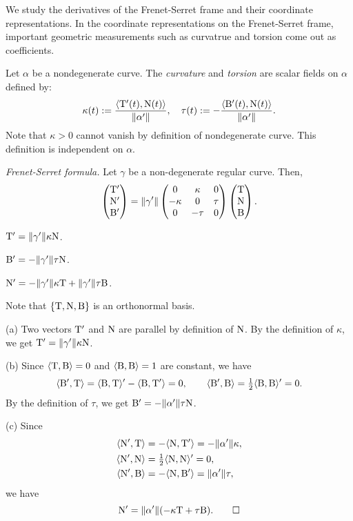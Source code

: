 \documentclass{../note}
\def\a{\alpha}
\begin{document}
We study the derivatives of the Frenet-Serret frame and their coordinate representations.
In the coordinate representations on the Frenet-Serret frame, important geometric measurements such as curvatrue and torsion come out as coefficients.

\begin{defn}
Let $\a$ be a nondegenerate curve.
The \emph{curvature} and \emph{torsion} are scalar fields on $\a$ defined by:
\[\kappa(t):=\frac{\<\rT'(t),\rN(t)\>}{\|\a'\|},\quad\tau(t):=-\frac{\<\rB'(t),\rN(t)\>}{\|\a'\|}.\]
Note that $\kappa>0$ cannot vanish by definition of nondegenerate curve.
This definition is independent on $\a$.
\end{defn}

\begin{prb}\emph{Frenet-Serret formula.}
Let $\gamma$ be a non-degenerate regular curve.
Then,
\[\begin{pmatrix}\mathrm{T}'\\\mathrm{N}'\\\mathrm{B}'\end{pmatrix}=\|\gamma'\|\begin{pmatrix}0&\kappa&0\\-\kappa&0&\tau\\0&-\tau&0\end{pmatrix}\begin{pmatrix}\mathrm{T}\\\mathrm{N}\\\mathrm{B}\end{pmatrix}.\]
\begin{parts}
\item $\mathrm{T}'=\|\gamma'\|\kappa\mathrm{N}$.
\item $\mathrm{B}'=-\|\gamma'\|\tau\mathrm{N}$.
\item $\mathrm{N}'=-\|\gamma'\|\kappa\mathrm{T}+\|\gamma'\|\tau\mathrm{B}$.
\end{parts}
\end{prb}
\begin{pf}
Note that $\{\mathrm{T},\mathrm{N},\mathrm{B}\}$ is an orthonormal basis.

(a)
Two vectors $\mathrm{T}'$ and $\mathrm{N}$ are parallel by definition of $\mathrm{N}$.
By the definition of $\kappa$, we get $\mathrm{T}'=\|\gamma'\|\kappa\mathrm{N}$.

(b)
Since $\langle\mathrm{T},\mathrm{B}\rangle=0$ and $\langle\mathrm{B},\mathrm{B}\rangle=1$ are constant, we have
\[\langle\mathrm{B}',\mathrm{T}\rangle=\langle\mathrm{B},\mathrm{T}\rangle'-\langle\mathrm{B},\mathrm{T}'\rangle=0,\qquad\langle\mathrm{B}',\mathrm{B}\rangle=\tfrac12\langle\mathrm{B},\mathrm{B}\rangle'=0.\]
By the definition of $\tau$, we get $\rB'=-\|\a'\|\tau\rN$.

(c)
Since
\begin{align*}
\<\rN',\rT\>&=-\<\rN,\rT'\>=-\|\a'\|\kappa,\\
\<\rN',\rN\>&=\tfrac12\<\rN,\rN\>'=0,\\
\<\rN',\rB\>&=-\<\rN,\rB'\>=\|\a'\|\tau,
\end{align*}
we have
\[\rN'=\|\a'\|(-\kappa\rT+\tau\rB).\qedhere\]
\end{pf}
\end{document}

